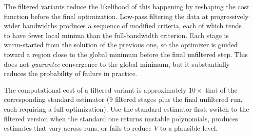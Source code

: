 \documentclass[11pt,a4paper]{article}
\begin{document}
The filtered variants reduce the likelihood of this happening by
reshaping the cost function before the final optimization.
Low-pass filtering the data at progressively wider bandwidths
produces a sequence of modified criteria, each of which tends to
have fewer local minima than the full-bandwidth criterion.
Each stage is warm-started from the solution of the previous one,
so the optimizer is guided toward a region close to the global
minimum before the final unfiltered step.
This does not \emph{guarantee} convergence to the global minimum,
but it substantially reduces the probability of failure in
practice.

The computational cost of a filtered variant is approximately
$10\times$ that of the corresponding standard estimator
(9 filtered stages plus the final unfiltered run, each requiring
a full optimization).  Use the standard estimator first; switch
to the filtered version when the standard one returns unstable
polynomials, produces estimates that vary across runs, or fails
to reduce $V$ to a plausible level.
\end{document}
